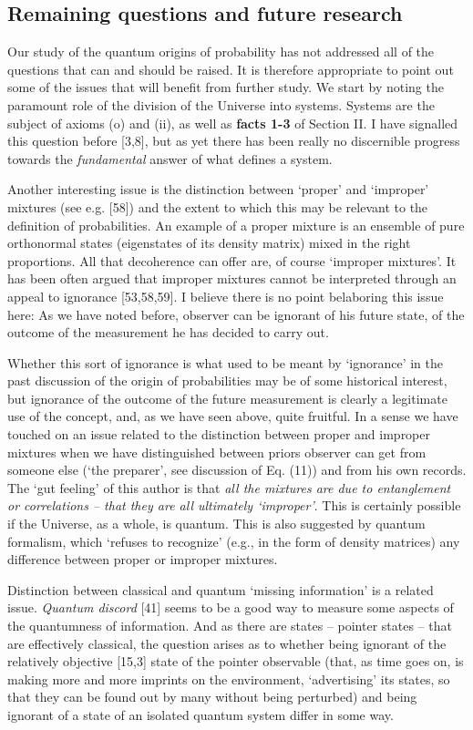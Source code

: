 \documentclass[aps,twocolumn,pra,epsfig]{revtex4}
\begin{document}
\subsection{Remaining questions and future research}

Our study of the quantum origins of probability has not addressed all of 
the questions that can and should be raised. It is therefore appropriate 
to point out some of the issues that will benefit from further study. We start 
by noting the paramount role of the division of the Universe into systems.
Systems are the subject of axioms (o) and (ii), as well as {\bf facts 1-3} 
of Section II. I have signalled this question before [3,8], but as yet there 
has been really no discernible progress towards the {\it fundamental} answer
of what defines a system.

Another interesting issue is the distinction between `proper' and `improper'
mixtures (see e.g. [58]) and the extent to which this may be relevant to the
definition of probabilities. An example of a proper mixture is an ensemble of
pure orthonormal states (eigenstates of its density matrix) mixed in the right
proportions. All that decoherence can offer are, of course `improper mixtures'.
It has been often argued that improper mixtures cannot be interpreted through
an appeal to ignorance [53,58,59]. I believe there is no point belaboring this
issue here: As we have noted before, observer can be ignorant of his future
state, of the outcome of the measurement he has decided to carry out. 

Whether this sort of ignorance is what used to be meant by `ignorance' in 
the past discussion of the origin of probabilities may be of some historical 
interest, but ignorance of the outcome of the future measurement is clearly 
a legitimate use of the concept, and, as we have seen above, quite fruitful.
In a sense we have touched on an issue related to the distinction
between proper and improper mixtures when we have distinguished between
priors observer can get from someone else (`the preparer', see discussion
of Eq. (11)) and from his own records. The `gut feeling' of this
author is that {\it all the mixtures are due to entanglement or correlations --
that they are all ultimately `improper'}. This is certainly possible if the Universe, as
a whole, is quantum. This is also suggested by quantum formalism, which
`refuses to recognize' (e.g., in the form of density matrices) any difference
between proper or improper mixtures.

Distinction between classical and quantum `missing information' is a related
issue. {\it Quantum discord} [41] seems to be a good way to measure some
aspects of the quantumness of information. And as there are states -- pointer
states -- that are effectively classical, the question arises as to whether
being ignorant of the relatively objective [15,3] state of the pointer
observable (that, as time goes on, is making more and more imprints on the
environment, `advertising' its states, so that they can be found out by many
without being perturbed) and being ignorant of a state of an isolated quantum
system differ in some way.
\end{document}
